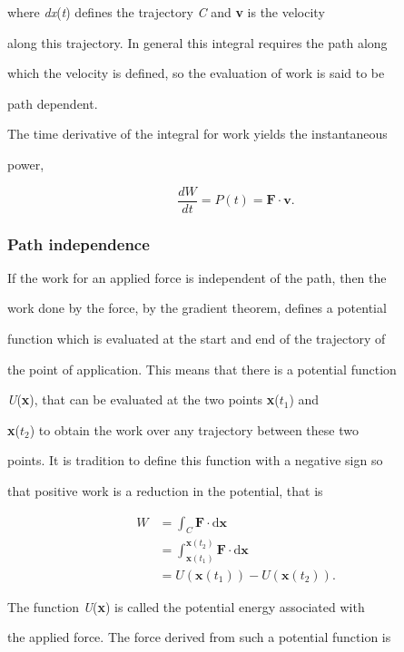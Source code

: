 where \textit{dx}(\textit{t}) defines the trajectory \textit{C} and \textbf{v} is the velocity

along this trajectory. In general this integral requires the path along

which the velocity is defined, so the evaluation of work is said to be

path dependent.


The time derivative of the integral for work yields the instantaneous

power,


\[
\frac{dW}{dt} = P(t) = \mathbf{F}\cdot \mathbf{v} .
\]


\subsubsection{Path independence}
\label{sss:path-59ea}


If the work for an applied force is independent of the path, then the

work done by the force, by the gradient theorem, defines a potential

function which is evaluated at the start and end of the trajectory of

the point of application. This means that there is a potential function

\textit{U}(\textbf{x}), that can be evaluated at the two points \textbf{x}($t_1$) and

\textbf{x}($t_2$) to obtain the work over any trajectory between these two

points. It is tradition to define this function with a negative sign so

that positive work is a reduction in the potential, that is


\begin{align}
W &= \int_C \mathbf{F} \cdot \mathrm{d}\mathbf{x} \\&=  \int _{\mathbf{x}(t_1)}^{\mathbf{x}(t_2)} \mathbf{F} \cdot \mathrm{d}\mathbf{x} \\&=  U(\mathbf{x}(t_1)) - U(\mathbf{x}(t_2)).
\end{align}


The function \textit{U}(\textbf{x}) is called the potential energy associated with

the applied force. The force derived from such a potential function is

